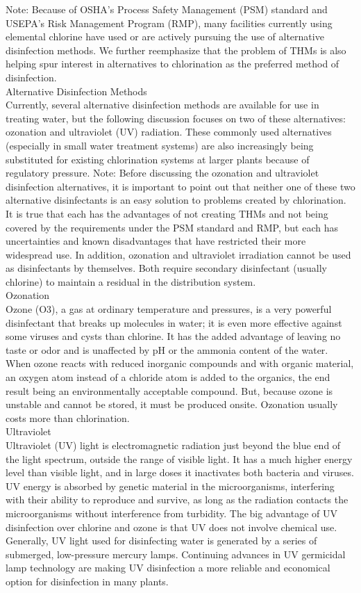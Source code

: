 \documentclass{article}
\begin{document}
Note: Because of OSHA’s Process Safety Management (PSM) standard and USEPA’s Risk Management Program (RMP), many facilities currently using elemental chlorine have used or are actively pursuing the use of alternative disinfection methods. We further reemphasize that the problem of THMs is also helping spur interest in alternatives to chlorination as the preferred method of disinfection.\\

Alternative Disinfection Methods\\
Currently, several alternative disinfection methods are available for use in treating water, but the following discussion focuses on two of these alternatives: ozonation and ultraviolet (UV) radiation. These commonly used alternatives (especially in small water treatment systems) are also increasingly being substituted for existing chlorination systems at larger plants because of regulatory pressure.
Note: Before discussing the ozonation and ultraviolet disinfection alternatives, it is important to point out that neither one of these two alternative disinfectants is an easy solution to problems created by chlorination. It is true that each has the advantages of not creating THMs and not being covered by the requirements under the PSM standard and RMP, but each has uncertainties and known disadvantages that have restricted their more widespread use. In addition, ozonation and ultraviolet irradiation cannot be used as disinfectants by themselves. Both require secondary disinfectant (usually chlorine) to maintain a residual in the distribution system.\\
Ozonation\\
Ozone (O3), a gas at ordinary temperature and pressures, is a very powerful disinfectant that breaks up molecules in water; it is even more effective against some viruses and cysts than chlorine. It has the added advantage of leaving no taste or odor and is unaffected by pH or the ammonia content of the water. When ozone reacts with reduced inorganic compounds and with organic material, an oxygen atom instead of a chloride atom is added to the organics, the end result being an environmentally acceptable compound. But, because ozone is unstable and cannot be stored, it must be produced onsite. Ozonation usually costs more than chlorination.\\
Ultraviolet\\
Ultraviolet (UV) light is electromagnetic radiation just beyond the blue end of the light spectrum, outside the range of visible light. It has a much higher energy level than visible light, and in large doses it inactivates both bacteria and viruses. UV energy is absorbed by genetic material in the microorganisms, interfering with their ability to reproduce and survive, as long as the radiation contacts the microorganisms without interference from turbidity. The big advantage of UV disinfection over chlorine and
ozone is that UV does not involve chemical use. Generally, UV light used for disinfecting water is generated by a series of submerged, low-pressure mercury lamps. Continuing advances in UV germicidal lamp technology are making UV disinfection a more reliable and economical option for disinfection in many plants.\\
\end{document}
